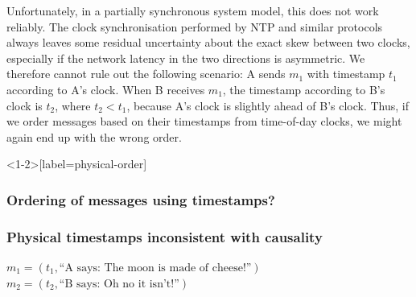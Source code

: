 Unfortunately, in a partially synchronous system model, this does not work reliably.
The clock synchronisation performed by NTP and similar protocols always leaves some residual uncertainty about the exact skew between two clocks, especially if the network latency in the two directions is asymmetric.
We therefore cannot rule out the following scenario: A sends $m_1$ with timestamp $t_1$ according to A's clock.
When B receives $m_1$, the timestamp according to B's clock is $t_2$, where $t_2 < t_1$, because A's clock is slightly ahead of B's clock.
Thus, if we order messages based on their timestamps from time-of-day clocks, we might again end up with the wrong order.

\begin{frame}<1-2>[label=physical-order]
    \label{s:physical-order}
    \frametitle<1-2>{Ordering of messages using timestamps?}
    \frametitle<3>{Physical timestamps inconsistent with causality}
    \begin{center}
    \end{center}
    $m_1 = (t_1, \text{``A says: The moon is made of cheese!''})$\\
    $m_2 = (t_2, \text{``B says: Oh no it isn't!''})$\\[1em]%
\end{frame}
\label{l:physical-order}


